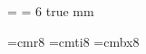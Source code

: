 


\magnification= 
\parskip=0pt
\baselineskip= 6 true mm



\font\smallrm=cmr8
\font\smallit=cmti8
\font\smallbf=cmbx8
\def\a{\alpha}
\def\b{\beta}
\def\g{\gamma} \def\G{\Gamma}
\def\d{\delta} \def\D{\Delta}
\def\e{\varepsilon}
\def\h{\eta}
\def\k{\kappa}
\def\l{\lambda} \def\L{\Lambda}
\def\m{\mu}
\def\f{\phi} \def\F{\Phi}
\def\n{\nu}
\def\j{\psi} \def\J{\Psi}
\def\r{\rho}
\def\s{\sigma} \def\S{\Sigma}
\def\t{\tau}
\def\th{\theta} \def\thh{\vartheta} \def\Th{\Theta}
\def\x{\xi} \def\X{\Xi}
\def\ch{\chi}
\def\w{\omega} \def\W{\Omega}
\def\v{\varphi}
\def\z{\zeta}
\def\om{\omega}
\def\slash{\llap /}
\def\Lagr{{\cal L}}
\def\pa{\partial}
\def\ddt{{{\rm d}\over{\rm d}t}}
\def\o{\over}
\def\Hin{{\rm {\cal H}_{in}^{BH}}}
\def\Hout{{\rm {\cal H}_{out}^{WH}}}

\def\today{September 27, 1993}

\def\thedate#1{\rightline{#1}}

